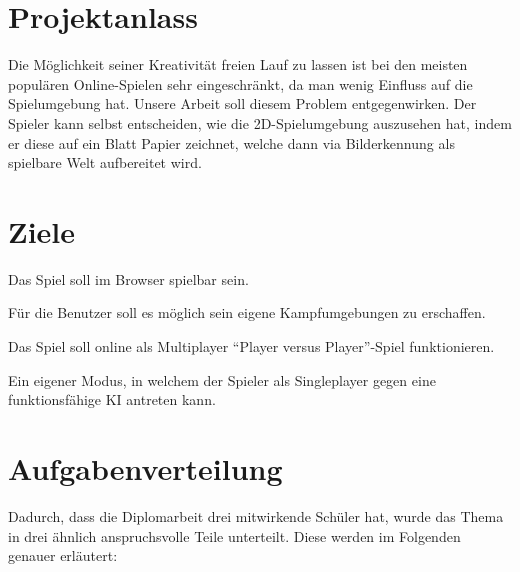 \section{Projektanlass}
Die Möglichkeit seiner Kreativität freien Lauf zu lassen ist bei den meisten populären
Online-Spielen sehr eingeschränkt, da man wenig Einfluss auf die Spielumgebung hat.
Unsere Arbeit soll diesem Problem entgegenwirken. Der Spieler kann selbst entscheiden,
wie die 2D-Spielumgebung auszusehen hat, indem er diese auf ein Blatt Papier zeichnet,
welche dann via Bilderkennung als spielbare Welt aufbereitet wird.

\section{Ziele}
\begin{compactitem}
    \item Das Spiel soll im Browser spielbar sein.
    \item Für die Benutzer soll es möglich sein eigene Kampfumgebungen zu erschaffen.
    \item Das Spiel soll online als Multiplayer ``Player versus Player''-Spiel funktionieren.
    \item Ein eigener Modus, in welchem der Spieler als Singleplayer gegen eine funktionsfähige KI antreten kann.
\end{compactitem}

\section{Aufgabenverteilung}
Dadurch, dass die Diplomarbeit drei mitwirkende Schüler hat, wurde das Thema in drei ähnlich
anspruchsvolle Teile unterteilt. Diese werden im Folgenden genauer erläutert:

